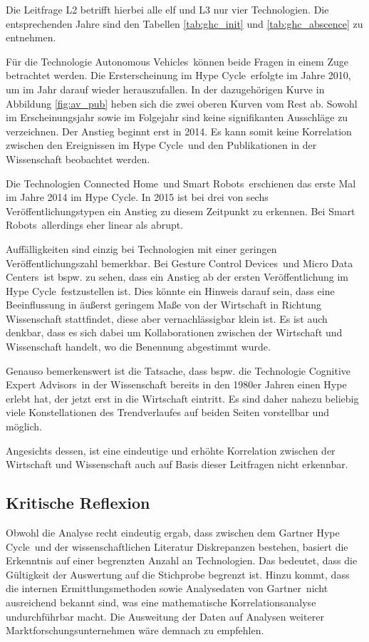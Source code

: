Die Leitfrage L2 betrifft hierbei alle elf und L3 nur vier Technologien. Die entsprechenden Jahre sind den Tabellen \ref{tab:ghc_init} und \ref{tab:ghc_abscence} zu entnehmen.

Für die Technologie \glqq Autonomous Vehicles\grqq~können beide Fragen in einem Zuge betrachtet werden. Die Ersterscheinung im \glqq Hype Cycle\grqq~erfolgte im Jahre 2010, um im Jahr darauf wieder herauszufallen. In der dazugehörigen Kurve in Abbildung \ref{fig:av_pub} heben sich die zwei oberen Kurven vom Rest ab. Sowohl im Erscheinungsjahr sowie im Folgejahr sind keine signifikanten Ausschläge zu verzeichnen. Der Anstieg beginnt erst in 2014. Es kann somit keine Korrelation zwischen den Ereignissen im \glqq Hype Cycle\grqq~und den Publikationen in der Wissenschaft beobachtet werden.

Die Technologien \glqq Connected Home\grqq~und \glqq Smart Robots\grqq~erschienen das erste Mal im Jahre 2014 im \glqq Hype Cycle\grqq. In 2015 ist bei drei von sechs Veröffentlichungstypen ein Anstieg zu diesem Zeitpunkt zu erkennen. Bei \glqq Smart Robots\grqq~allerdings eher linear als abrupt.

Auffälligkeiten sind einzig bei Technologien mit einer geringen Veröffentlichungszahl bemerkbar. Bei \glqq Gesture Control Devices\grqq~und \glqq Micro Data Centers\grqq~ist bspw. zu sehen, dass ein Anstieg ab der ersten Veröffentlichung im \glqq Hype Cycle\grqq~festzustellen ist. Dies könnte ein Hinweis darauf sein, dass eine Beeinflussung in äußerst geringem Maße von der Wirtschaft in Richtung Wissenschaft stattfindet, diese aber vernachlässigbar klein ist. Es ist auch denkbar, dass es sich dabei um Kollaborationen zwischen der Wirtschaft und Wissenschaft handelt, wo die Benennung abgestimmt wurde.

Genauso bemerkenswert ist die Tatsache, dass bspw. die Technologie \glqq Cognitive Expert Advisors\grqq~in der Wissenschaft bereits in den 1980er Jahren einen Hype erlebt hat, der jetzt erst in die Wirtschaft eintritt. Es sind daher nahezu beliebig viele Konstellationen des Trendverlaufes auf beiden Seiten vorstellbar und möglich.

Angesichts dessen, ist eine eindeutige und erhöhte Korrelation zwischen der Wirtschaft und Wissenschaft auch auf Basis dieser Leitfragen nicht erkennbar.

\subsection{Kritische Reflexion}
Obwohl die Analyse recht eindeutig ergab, dass zwischen dem \glqq Gartner Hype Cycle\grqq~und der wissenschaftlichen Literatur Diskrepanzen bestehen, basiert die Erkenntnis auf einer begrenzten Anzahl an Technologien. Das bedeutet, dass die Gültigkeit der Auswertung auf die Stichprobe begrenzt ist. Hinzu kommt, dass die internen Ermittlungsmethoden sowie Analysedaten von \glqq Gartner\grqq~nicht ausreichend bekannt sind, was eine mathematische Korrelationsanalyse undurchführbar macht. Die Ausweitung der Daten auf Analysen weiterer Marktforschungsunternehmen wäre demnach zu empfehlen.

